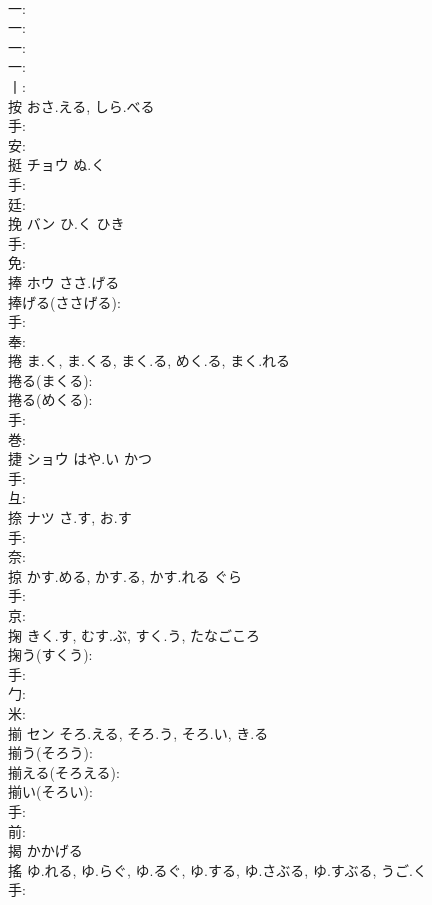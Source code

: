 \documentclass[8pt]{extreport}
\begin{document}
\begin{CJK}{UTF8}{min}
\\	一: 
\\	一: 
\\	一: 
\\	一: 
\\	丨: 
\\	按		おさ.える, しら.べる			
\\	手: 
\\	安: 
\\	挺	チョウ	ぬ.く		
\\	手: 
\\	廷: 
\\	挽	バン	ひ.く	ひき	
\\	手: 
\\	免: 
\\	捧	ホウ	ささ.げる		
\\	捧げる(ささげる): 
\\	手: 
\\	奉: 
\\	捲		ま.く, ま.くる, まく.る, めく.る, まく.れる				
\\	捲る(まくる): 
\\	捲る(めくる): 
\\	手: 
\\	巻: 
\\	捷	ショウ	はや.い	かつ	
\\	手: 
\\	彑: 
\\	捺	ナツ	さ.す, お.す		
\\	手: 
\\	奈: 
\\	掠		かす.める, かす.る, かす.れる	ぐら		
\\	手: 
\\	京: 
\\	掬		きく.す, むす.ぶ, すく.う, たなごころ				
\\	掬う(すくう): 
\\	手: 
\\	勹: 
\\	米: 
\\	揃	セン	そろ.える, そろ.う, そろ.い, き.る		
\\	揃う(そろう): 
\\	揃える(そろえる): 
\\	揃い(そろい): 
\\	手: 
\\	前: 
\\	揭		かかげる				
\\	搖		ゆ.れる, ゆ.らぐ, ゆ.るぐ, ゆ.する, ゆ.さぶる, ゆ.すぶる, うご.く				
\\	手: 

\end{CJK}
\end{document}
